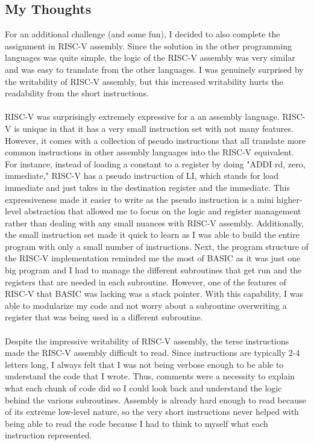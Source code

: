 \documentclass[letterpaper, 10pt, DIV=13]{scrartcl}
\numberwithin{equation}{section}
\numberwithin{figure}{section}
\numberwithin{table}{section}
\begin{document}
\subsection{My Thoughts}
For an additional challenge (and some fun), I decided to also complete the assignment in RISC-V assembly. Since the solution in the other programming languages was quite simple, the logic of the RISC-V assembly was very similar and was easy to translate from the other languages. I was genuinely surprised by the writability of RISC-V assembly, but this increased writability hurts the readability from the short instructions.
\\ \\
RISC-V was surprisingly extremely expressive for a an assembly language. RISC-V is unique in that it has a very small instruction set with not many features. However, it comes with a collection of pseudo instructions that all translate more common instructions in other assembly languages into the RISC-V equivalent. For instance, instead of loading a constant to a register by doing "ADDI rd, zero, immediate," RISC-V has a pseudo instruction of LI, which stands for load immediate and just takes in the destination register and the immediate. This expressiveness made it easier to write as the pseudo instruction is a mini higher-level abstraction that allowed me to focus on the logic and register management rather than dealing with any small nuances with RISC-V assembly. Additionally, the small instruction set made it quick to learn as I was able to build the entire program with only a small number of instructions. Next, the program structure of the RISC-V implementation reminded me the most of BASIC as it was just one big program and I had to manage the different subroutines that get run and the registers that are needed in each subroutine. However, one of the features of RISC-V that BASIC was lacking was a stack pointer. With this capability, I was able to modularize my code and not worry about a subroutine overwriting a register that was being used in a different subroutine.
\\ \\
Despite the impressive writability of RISC-V assembly, the terse instructions made the RISC-V assembly difficult to read. Since instructions are typically 2-4 letters long, I always felt that I was not being verbose enough to be able to understand the code that I wrote. Thus, comments were a necessity to explain what each chunk of code did so I could look back and understand the logic behind the various subroutines. Assembly is already hard enough to read because of its extreme low-level nature, so the very short instructions never helped with being able to read the code because I had to think to myself what each instruction represented.
\end{document}
